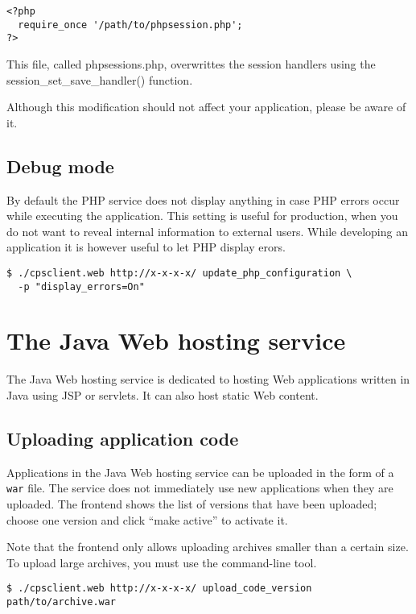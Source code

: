 \documentclass[10pt]{article}
\begin{document}
\begin{verbatim}
<?php
  require_once '/path/to/phpsession.php';
?>
\end{verbatim}

This file, called phpsessions.php, overwrittes the session handlers using the
session\_set\_save\_handler() function.

Although this modification should not affect your application, please be aware
of it.

\subsection{Debug mode}

By default the PHP service does not display anything in case PHP
errors occur while executing the application. This setting is useful
for production, when you do not want to reveal internal information to
external users. While developing an application it is however useful
to let PHP display erors.
\begin{verbatim}
$ ./cpsclient.web http://x-x-x-x/ update_php_configuration \
  -p "display_errors=On" 
\end{verbatim}

\section{The Java Web hosting service}

The Java Web hosting service is dedicated to hosting Web applications
written in Java using JSP or servlets. It can also host static Web
content.

\subsection{Uploading application code}

Applications in the Java Web hosting service can be uploaded in the
form of a \texttt{war} file. The service does not immediately use new
applications when they are uploaded. The frontend shows the list of
versions that have been uploaded; choose one version and click ``make
active'' to activate it.  

Note that the frontend only allows uploading archives smaller than a
certain size.  To upload large archives, you must use the command-line
tool.
\begin{verbatim}
$ ./cpsclient.web http://x-x-x-x/ upload_code_version path/to/archive.war
\end{verbatim}
\end{document}
